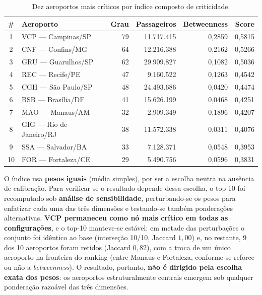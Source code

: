\documentclass[12pt,a4paper]{article}
\begin{document}
\begin{table}[h!]
\centering
\renewcommand{\arraystretch}{1.3}
\small
\begin{tabular}{clrrrr}
\toprule
\textbf{\#} & \textbf{Aeroporto} & \textbf{Grau} & \textbf{Passageiros} & \textbf{Betweenness} & \textbf{Score} \\
\midrule
1  & VCP --- Campinas/SP       & 79 & 11.717.415 & 0{,}2859 & 0{,}5815 \\
2  & CNF --- Confins/MG        & 64 & 12.216.388 & 0{,}2162 & 0{,}5266 \\
3  & GRU --- Guarulhos/SP      & 62 & 29.909.827 & 0{,}1082 & 0{,}5036 \\
4  & REC --- Recife/PE         & 47 &  9.160.522 & 0{,}1263 & 0{,}4542 \\
5  & CGH --- São Paulo/SP      & 48 & 24.493.686 & 0{,}0420 & 0{,}4474 \\
6  & BSB --- Brasília/DF       & 41 & 15.626.199 & 0{,}0468 & 0{,}4251 \\
7  & MAO --- Manaus/AM         & 32 &  2.909.349 & 0{,}1896 & 0{,}4207 \\
8  & GIG --- Rio de Janeiro/RJ & 38 & 11.572.338 & 0{,}0311 & 0{,}4076 \\
9  & SSA --- Salvador/BA       & 33 &  7.128.371 & 0{,}0548 & 0{,}3953 \\
10 & FOR --- Fortaleza/CE      & 29 &  5.490.756 & 0{,}0596 & 0{,}3831 \\
\bottomrule
\end{tabular}
\caption{Dez aeroportos mais críticos por índice composto de criticidade.}
\label{tab:ranking}
\end{table}

O índice usa \textbf{pesos iguais} (média simples), por ser a escolha neutra na ausência de
calibração. Para verificar se o resultado depende dessa escolha, o top-10 foi recomputado sob
\textbf{análise de sensibilidade}, perturbando-se os pesos para enfatizar cada uma das três
dimensões e testando-se também ponderações alternativas. \textbf{VCP permaneceu como nó mais
crítico em todas as configurações}, e o top-10 manteve-se estável: em metade das perturbações o
conjunto foi idêntico ao base (interseção 10/10, Jaccard $1{,}00$) e, no restante, 9 dos 10
aeroportos foram retidos (Jaccard $0{,}82$), com a troca de um único aeroporto na fronteira do
ranking (entre Manaus e Fortaleza, conforme se reforce ou não a \textit{betweenness}). O
resultado, portanto, \textbf{não é dirigido pela escolha exata dos pesos}: os aeroportos
estruturalmente centrais emergem sob qualquer ponderação razoável das três dimensões.
\end{document}

